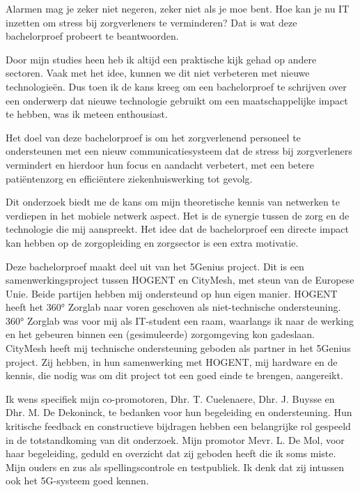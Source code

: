 Alarmen mag je zeker niet negeren, zeker niet als je moe bent. Hoe kan je nu IT inzetten om stress bij zorgverleners te verminderen? Dat is wat deze bachelorproef probeert te beantwoorden.

Door mijn studies heen heb ik altijd een praktische kijk gehad op andere sectoren. Vaak met het idee, kunnen we dit niet verbeteren met nieuwe technologieën. Dus toen ik de kans kreeg om een bachelorproef te schrijven over een onderwerp dat nieuwe technologie gebruikt om een maatschappelijke impact te hebben, was ik meteen enthousiast.

Het doel van deze bachelorproef is om het zorgverlenend personeel te ondersteunen met een nieuw communicatiesysteem dat de stress bij zorgverleners vermindert en hierdoor hun focus en aandacht verbetert, met een betere patiëntenzorg en efficiëntere ziekenhuiswerking tot gevolg.

Dit onderzoek biedt me de kans om mijn theoretische kennis van netwerken te verdiepen in het mobiele netwerk aspect. Het is de synergie tussen de zorg en de technologie die mij aanspreekt. Het idee dat de bachelorproef een directe impact kan hebben op de zorgopleiding en zorgsector is een extra motivatie.

Deze bachelorproef maakt deel uit van het 5Genius project. Dit is een samenwerkingsproject tussen HOGENT en CityMesh, met steun van de Europese Unie. Beide partijen hebben mij ondersteund op hun eigen manier. HOGENT heeft het 360° Zorglab naar voren geschoven als niet-technische ondersteuning. 360° Zorglab was voor mij als IT-student een raam, waarlangs ik naar de werking en het gebeuren binnen een (gesimuleerde) zorgomgeving kon gadeslaan. CityMesh heeft mij technische ondersteuning geboden als partner in het 5Genius project. Zij hebben, in hun samenwerking met HOGENT, mij hardware en de kennis, die nodig was om dit project tot een goed einde te brengen, aangereikt.

Ik wens specifiek mijn co-promotoren, Dhr. T. Cuelenaere, Dhr. J. Buysse en Dhr. M. De Dekoninck, te bedanken voor hun begeleiding en ondersteuning. Hun kritische feedback en constructieve bijdragen hebben een belangrijke rol gespeeld in de totstandkoming van dit onderzoek. Mijn promotor Mevr. L. De Mol, voor haar begeleiding, geduld en overzicht dat zij geboden heeft die ik soms miste.
Mijn ouders en zus als spellingscontrole en testpubliek. Ik denk dat zij intussen ook het 5G-systeem goed kennen.

